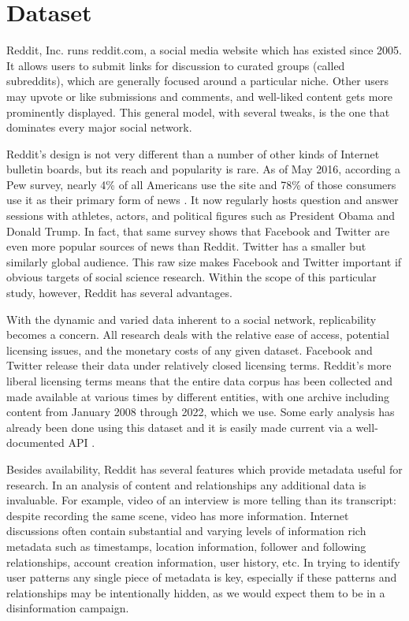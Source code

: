 \documentclass[doublespacing]{utdthesis}
\let\cite=\citep
\begin{document}
\section{Dataset}

Reddit, Inc. runs reddit.com, a social media website which has existed since 2005.
It allows users to submit links for discussion to curated groups (called subreddits), which are generally focused around a particular niche.
Other users may upvote or like submissions and comments, and well-liked
content gets more prominently displayed.
This general model, with several tweaks, is the one that dominates every major social network.

Reddit’s design is not very different than a number of other kinds of Internet bulletin boards, but its reach and popularity is rare.
As of May 2016, according a Pew survey, nearly 4\% of all Americans use the site and 78\% of those consumers use it as their primary form of news \cite{pew2016}.
It now regularly hosts question and answer sessions with athletes, actors, and political figures such as President Obama and Donald Trump.
In fact, that same survey shows that Facebook and Twitter are even more popular sources of news than Reddit.
Twitter has a smaller but similarly global audience.
This raw size makes Facebook and Twitter important if obvious targets of social science research.
Within the scope of this particular study, however, Reddit has several advantages.

With the dynamic and varied data inherent to a social network, replicability becomes a concern.
All research deals with the relative ease of access, potential licensing issues, and the monetary costs of any given dataset.
Facebook and Twitter release their data under relatively closed licensing terms.
Reddit’s more liberal licensing terms means that the entire data corpus has been collected and made available at various times by different entities, with one archive including content from January 2008 through 2022, which we use.
Some early analysis has already been done using this dataset and it is easily made current via a well-documented API \cite{balsamo2021}.

Besides availability, Reddit has several features which provide metadata useful for research.
In an analysis of content and relationships any additional data is invaluable. For example, video of an interview is more telling than its transcript: despite recording the same scene, video has more information.
Internet discussions often contain substantial and varying levels of information rich metadata such as timestamps, location information, follower and following relationships, account creation information, user history, etc. In trying to identify user patterns any single piece of metadata is key, especially if these patterns and relationships may be intentionally hidden, as we would expect them to be in a disinformation campaign.
\end{document}
